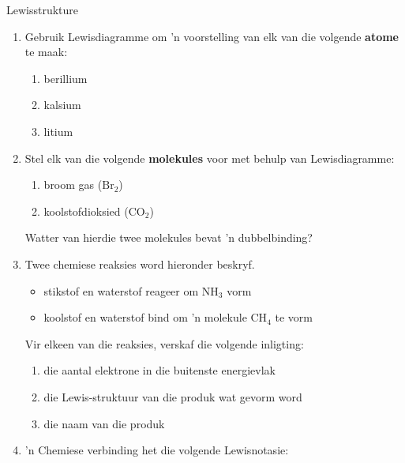 \begin{exercises}{Lewisstrukture}
{
            \nopagebreak
      \label{m38701*id140889}\begin{enumerate}[noitemsep, label=\textbf{\arabic*}. ] 
            \label{m38701*uid23}\item Gebruik Lewisdiagramme om 'n voorstelling van elk van die volgende \textbf{atome} te maak:
\label{m38701*id140910}\begin{enumerate}[noitemsep, label=\textbf{\alph*}. ] 
            \label{m38701*uid24}\item berillium
\label{m38701*uid25}\item kalsium
\label{m38701*uid26}\item litium
\end{enumerate}
                \label{m38701*uid27}\item  Stel elk van die volgende \textbf{molekules} voor met behulp van Lewisdiagramme:
\label{m38701*id140969}\begin{enumerate}[noitemsep, label=\textbf{\alph*}. ] 
            \label{m38701*uid28}\item broom gas ($\text{Br}{}_{2}$)
\label{m38701*uid29}\item koolstofdioksied ($\text{CO}{}_{2}$)
\end{enumerate}
Watter van hierdie twee molekules bevat 'n dubbelbinding?
\label{m38701*uid31}\item Twee chemiese reaksies word hieronder beskryf.
\label{m38701*id141048}\begin{itemize}[noitemsep]
            \label{m38701*uid32}\item stikstof en waterstof reageer om $\text{NH}_{3}$ vorm
\label{m38701*uid33}\item koolstof en waterstof bind om 'n molekule $\text{CH}_{4}$ te vorm
\end{itemize}
Vir elkeen van die reaksies, verskaf die volgende inligting:
\label{m38701*id141106}\begin{enumerate}[noitemsep, label=\textbf{\alph*}. ] 
\item die aantal elektrone in die buitenste energievlak
\label{m38701*uid35}\item die Lewis-struktuur van die produk wat gevorm word
\label{m38701*uid37}\item die naam van die produk
\end{enumerate}
                \label{m38701*uid38}\item 'n Chemiese verbinding het die volgende Lewisnotasie:

\end{enumerate}}
\end{exercises}
